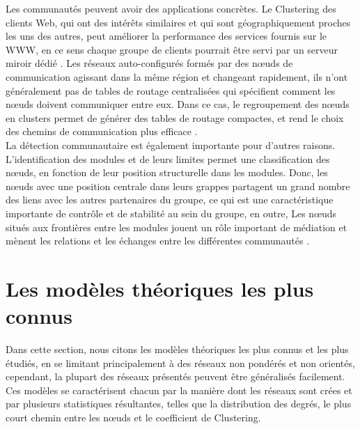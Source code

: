 Les communautés peuvent avoir des applications concrètes. Le Clustering des clients Web,     qui ont des intérêts similaires et qui sont géographiquement proches les uns des autres, peut améliorer la performance des services fournis sur le WWW, en ce sens chaque groupe de clients pourrait être servi par un serveur miroir dédié \cite{KriW2000}.
Les réseaux auto-configurés formés par des nœuds de communication agissant dans la même région et changeant rapidement, ils n'ont généralement pas de tables de routage centralisées qui spécifient comment les nœuds doivent communiquer entre eux.
Dans ce cas, le regroupement des nœuds en clusters permet de générer des tables de routage compactes, et rend le choix des chemins de communication plus efficace \cite{Steen2001}.\\
La détection communautaire est également importante pour d'autres raisons. L'identification des modules et de leurs limites permet une classification des nœuds, en fonction de leur position structurelle dans les modules. Donc, les nœuds avec une position centrale dans leurs grappes partagent un grand nombre des liens avec les autres partenaires du groupe, ce qui est une caractéristique importante de contrôle et de stabilité au sein du groupe, en outre, Les nœuds situés aux frontières entre les modules jouent un rôle important de médiation et mènent les relations et les échanges entre les différentes communautés \cite{Csermely2008}.

\section{Les modèles théoriques les plus connus} 
Dans cette section, nous citons les modèles théoriques les plus connus et les plus étudiés, en se limitant principalement à des réseaux non pondérés et non orientés, cependant, la plupart des réseaux présentés peuvent être généralisés facilement. Ces modèles se caractérisent chacun par la manière dont les réseaux sont crées et par plusieurs statistiques résultantes, telles que la distribution des degrés, le plus court chemin entre les nœuds et le coefficient de Clustering.

